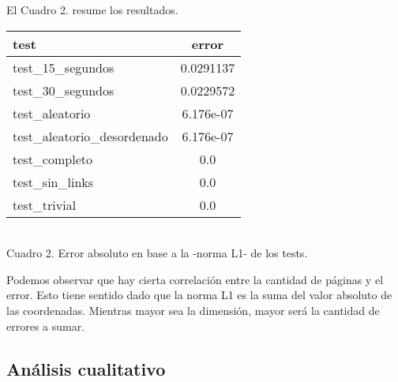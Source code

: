 \noindent El Cuadro 2. resume los resultados.
\vspace{1.5em}

\begin{center}
    \begin{tabular}{ |l|c| } 
    \hline
    test                         & error        \\
    \hline
    test\_15\_segundos           & 0.0291137    \\
    test\_30\_segundos           & 0.0229572    \\
    test\_aleatorio              & 6.176e-07    \\
    test\_aleatorio\_desordenado & 6.176e-07    \\
    test\_completo               & 0.0          \\
    test\_sin\_links             & 0.0          \\
    test\_trivial                & 0.0          \\
    \hline
    \end{tabular} \\
    \bigskip
    Cuadro 2. Error absoluto en base a la -norma L1- de los tests. 
\end{center}
\vspace{1em}

Podemos observar que hay cierta correlación entre la cantidad de páginas y el error. Esto tiene sentido dado que la norma L1 es la suma del valor absoluto de las coordenadas. Mientras mayor sea la dimensión, mayor será la cantidad de errores a sumar.


\vspace{2em}
\subsection{Análisis cualitativo}